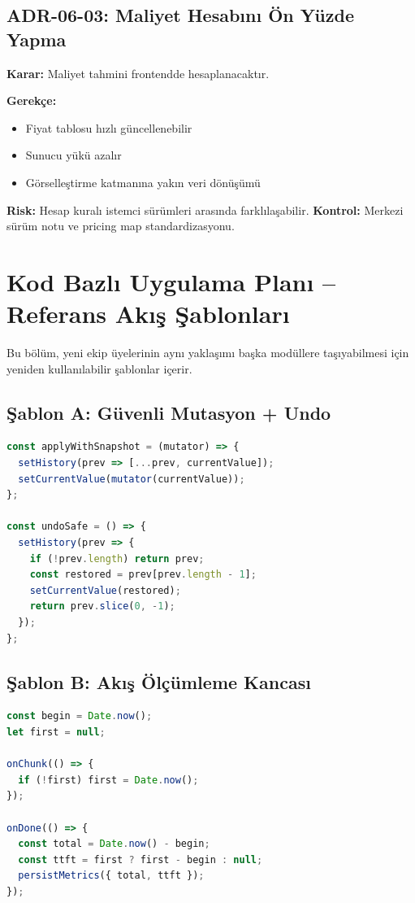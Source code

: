 \documentclass[12pt,a4paper]{article}
\begin{document}
\subsection{ADR-06-03: Maliyet Hesabını Ön Yüzde Yapma}
\textbf{Karar:} Maliyet tahmini frontendde hesaplanacaktır.

\textbf{Gerekçe:}
\begin{itemize}[leftmargin=*]
  \item Fiyat tablosu hızlı güncellenebilir
  \item Sunucu yükü azalır
  \item Görselleştirme katmanına yakın veri dönüşümü
\end{itemize}

\textbf{Risk:} Hesap kuralı istemci sürümleri arasında farklılaşabilir.\newline
\textbf{Kontrol:} Merkezi sürüm notu ve pricing map standardizasyonu.

\section{Kod Bazlı Uygulama Planı -- Referans Akış Şablonları}

Bu bölüm, yeni ekip üyelerinin aynı yaklaşımı başka modüllere taşıyabilmesi için yeniden kullanılabilir şablonlar içerir.

\subsection{Şablon A: Güvenli Mutasyon + Undo}
\begin{lstlisting}[language=JavaScript]
const applyWithSnapshot = (mutator) => {
  setHistory(prev => [...prev, currentValue]);
  setCurrentValue(mutator(currentValue));
};

const undoSafe = () => {
  setHistory(prev => {
    if (!prev.length) return prev;
    const restored = prev[prev.length - 1];
    setCurrentValue(restored);
    return prev.slice(0, -1);
  });
};
\end{lstlisting}

\subsection{Şablon B: Akış Ölçümleme Kancası}
\begin{lstlisting}[language=JavaScript]
const begin = Date.now();
let first = null;

onChunk(() => {
  if (!first) first = Date.now();
});

onDone(() => {
  const total = Date.now() - begin;
  const ttft = first ? first - begin : null;
  persistMetrics({ total, ttft });
});
\end{lstlisting}
\end{document}
